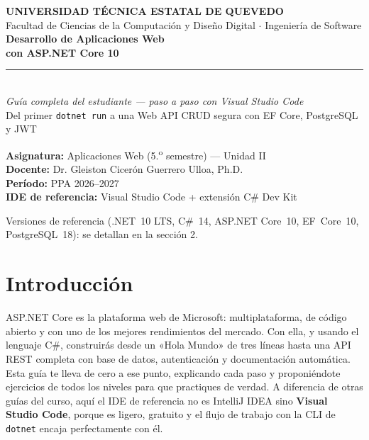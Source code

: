 \documentclass[11pt]{article}
\begin{document}
\begin{titlepage}
\vspace*{1.2cm}
{\color{uteqverde}\bfseries\large UNIVERSIDAD T\'ECNICA ESTATAL DE QUEVEDO}\\[2pt]
{\color{gray} Facultad de Ciencias de la Computaci\'on y Dise\~no Digital $\cdot$ Ingenier\'ia de Software}\\[2.2cm]
{\color{tinta}\bfseries\fontsize{30}{34}\selectfont Desarrollo de Aplicaciones Web}\\[6pt]
{\color{netmorado}\bfseries\fontsize{30}{34}\selectfont con ASP.NET Core 10}\\[10pt]
{\color{uteqoro}\rule{\linewidth}{2.2pt}}\\[10pt]
{\itshape\large Gu\'ia completa del estudiante --- paso a paso con Visual Studio Code}\\[4pt]
{\color{gray} Del primer \texttt{dotnet run} a una Web API CRUD segura con EF Core, PostgreSQL y JWT}\\[3cm]
\begin{flushleft}
\textbf{Asignatura:} Aplicaciones Web (5.\textsuperscript{o} semestre) --- Unidad II\\[3pt]
\textbf{Docente:} Dr. Gleiston Cicer\'on Guerrero Ulloa, Ph.D.\\[3pt]
\textbf{Per\'iodo:} PPA 2026--2027\\[3pt]
\textbf{IDE de referencia:} Visual Studio Code + extensi\'on C\# Dev Kit
\end{flushleft}
\vfill
{\color{gray}\small Versiones de referencia (.NET~10 LTS, C\#~14, ASP.NET Core~10, EF~Core~10, PostgreSQL~18): se detallan en la secci\'on 2.}
\end{titlepage}
\tableofcontents
\clearpage
\section{Introducción}
ASP.NET Core es la plataforma web de Microsoft: multiplataforma, de código abierto y con uno de los mejores rendimientos del mercado. Con ella, y usando el lenguaje C\#, construirás desde un «Hola Mundo» de tres líneas hasta una API REST completa con base de datos, autenticación y documentación automática. Esta guía te lleva de cero a ese punto, explicando cada paso y proponiéndote ejercicios de todos los niveles para que practiques de verdad. A diferencia de otras guías del curso, aquí el IDE de referencia no es IntelliJ IDEA sino \textbf{Visual Studio Code}, porque es ligero, gratuito y el flujo de trabajo con la CLI de \texttt{dotnet} encaja perfectamente con él.
\end{document}
